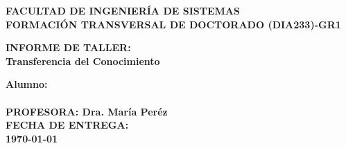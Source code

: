 \pagestyle{empty}
\begin{titlepage}
  \begin{center}
    \noindent \huge \textbf{FACULTAD DE INGENIERÍA DE SISTEMAS}\\ \vspace{2.cm}
    \noindent \huge \textbf{FORMACIÓN TRANSVERSAL DE DOCTORADO (DIA233)-GR1}\\ \vspace{2.cm}
    

  \end{center}

  \begin{center}
    \noindent \huge{\textbf{INFORME DE TALLER: \\Transferencia del Conocimiento}}

  \end{center}

  \vspace{0.5cm}

  \begin{center}
    \noindent \huge{\textbf{Alumno:}}\\
    \\
    \vspace{ 2.0cm}
    \noindent \huge{ \textbf{PROFESORA: Dra. María Peréz}}\\
    \vspace{2.cm}
    \noindent \huge{ \textbf{FECHA DE ENTREGA: \\ \vspace{0.5cm}\today}}
  \end{center}
  \newpage
  \cleardoublepage
\end{titlepage}
